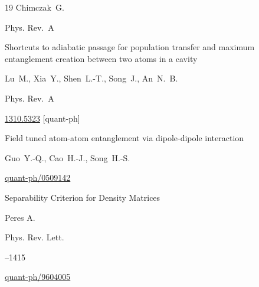 \begin{thebibliography}{19}
\by   Chimczak~G.

\jour Phys. Rev.~A













\paper Shortcuts to adiabatic passage for population transfer and maximum entanglement creation between two atoms in a cavity

\by   Lu~M.,  Xia~Y., Shen~L.-T., Song~J., An~N.~B.

\jour Phys. Rev.~A






\arxiv \href{http://arxiv.org/abs/1310.5323}{1310.5323} [quant-ph]






\preprint Field tuned atom-atom entanglement via dipole-dipole interaction

\by    Guo~Y.-Q.,  Cao~H.-J.,  Song~H.-S.

\arxiv \href{http://arxiv.org/abs/quant-ph/0509142}{quant-ph/0509142}










\paper Separability Criterion for Density Matrices

\by   Peres A.

\jour Phys. Rev. Lett.




--1415


\arxiv \href{http://arxiv.org/abs/quant-ph/9604005}{quant-ph/9604005}




\end{thebibliography}
